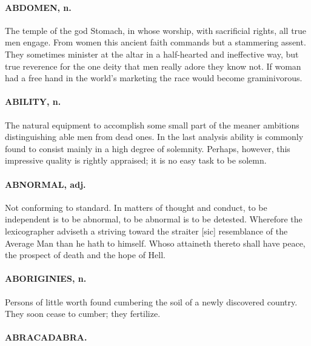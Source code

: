 \documentclass[11pt]{article}
\begin{document}
\paragraph{ABDOMEN, n.}  The temple of the god Stomach, in whose worship, with
sacrificial rights, all true men engage.  From women this ancient
faith commands but a stammering assent.  They sometimes minister at
the altar in a half-hearted and ineffective way, but true reverence
for the one deity that men really adore they know not.  If woman had a
free hand in the world's marketing the race would become
graminivorous.

\paragraph{ABILITY, n.}  The natural equipment to accomplish some small part of
the meaner ambitions distinguishing able men from dead ones.  In the
last analysis ability is commonly found to consist mainly in a high
degree of solemnity.  Perhaps, however, this impressive quality is
rightly appraised; it is no easy task to be solemn.

\paragraph{ABNORMAL, adj.}  Not conforming to standard.  In matters of thought and
conduct, to be independent is to be abnormal, to be abnormal is to be
detested.  Wherefore the lexicographer adviseth a striving toward the
straiter [sic] resemblance of the Average Man than he hath to himself.
Whoso attaineth thereto shall have peace, the prospect of death and
the hope of Hell.

\paragraph{ABORIGINIES, n.}  Persons of little worth found cumbering the soil of a
newly discovered country.  They soon cease to cumber; they fertilize.

\paragraph{ABRACADABRA.}
\end{document}
